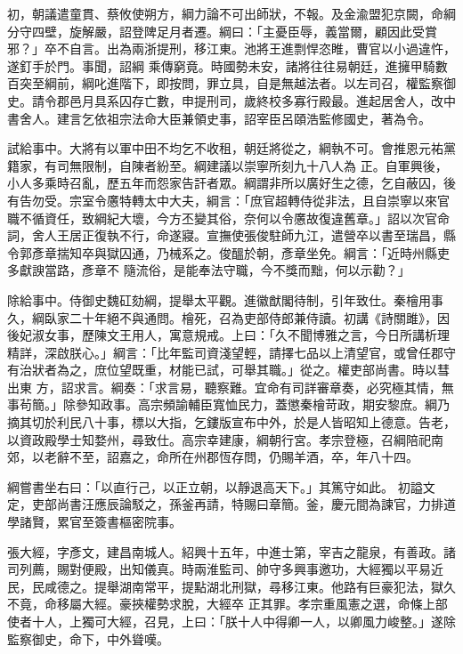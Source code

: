 \begin{pinyinscope}
 初，朝議遣童貫、蔡攸使朔方，綱力論不可出師狀，不報。及金渝盟犯京闕，命綱分守四壁，旋解嚴，詔登陴足月者遷。綱曰：「主憂臣辱，義當爾，顧因此受賞邪？」卒不自言。出為兩浙提刑，移江東。池將王進剽悍恣睢，曹官以小過違忤，遂釘手於門。事聞，詔綱
 乘傳窮竟。時國勢未安，諸將往往易朝廷，進擁甲騎數百突至綱前，綱叱進階下，即按問，罪立具，自是無越法者。以左司召，權監察御史。請令郡邑月具系囚存亡數，申提刑司，歲終校多寡行殿最。進起居舍人，改中書舍人。建言乞依祖宗法命大臣兼領史事，詔宰臣呂頤浩監修國史，著為令。



 試給事中。大將有以軍中田不均乞不收租，朝廷將從之，綱執不可。會推恩元祐黨籍家，有司無限制，自陳者紛至。綱建議以崇寧所刻九十八人為
 正。自軍興後，小人多乘時召亂，歷五年而怨家告訐者眾。綱謂非所以廣好生之德，乞自蔽囚，後有告勿受。宗室令懬特轉太中大夫，綱言：「庶官超轉侍從非法，且自崇寧以來官職不循資任，致綱紀大壞，今方丕變其俗，奈何以令懬故復違舊章。」詔以次官命詞，舍人王居正復執不行，命遂寢。宣撫使張俊駐師九江，遣營卒以書至瑞昌，縣令郭彥章揣知卒與獄囚通，乃械系之。俊醞於朝，彥章坐免。綱言：「近時州縣吏多獻諛當路，彥章不
 隨流俗，是能奉法守職，今不獎而黜，何以示勸？」



 除給事中。侍御史魏矼劾綱，提舉太平觀。進徽猷閣待制，引年致仕。秦檜用事久，綱臥家二十年絕不與通問。檜死，召為吏部侍郎兼侍讀。初講《詩關雎》，因後妃淑女事，歷陳文王用人，寓意規戒。上曰：「久不聞博雅之言，今日所講析理精詳，深啟朕心。」綱言：「比年監司資淺望輕，請擇七品以上清望官，或曾任郡守有治狀者為之，庶位望既重，材能已試，可舉其職。」從之。權吏部尚書。時以彗出東
 方，詔求言。綱奏：「求言易，聽察難。宜命有司詳審章奏，必究極其情，無事茍簡。」除參知政事。高宗頻諭輔臣寬恤民力，蓋懲秦檜苛政，期安黎庶。綱乃摘其切於利民八十事，標以大指，乞鏤版宣布中外，於是人皆昭知上德意。告老，以資政殿學士知婺州，尋致仕。高宗幸建康，綱朝行宮。孝宗登極，召綱陪祀南郊，以老辭不至，詔嘉之，命所在州郡恆存問，仍賜羊酒，卒，年八十四。



 綱嘗書坐右曰：「以直行己，以正立朝，以靜退高天下。」其篤守如此。
 初謚文定，吏部尚書汪應辰論駁之，孫釜再請，特賜曰章簡。釜，慶元間為諫官，力排道學諸賢，累官至簽書樞密院事。



 張大經，字彥文，建昌南城人。紹興十五年，中進士第，宰吉之龍泉，有善政。諸司列薦，賜對便殿，出知儀真。時兩淮監司、帥守多興事邀功，大經獨以平易近民，民咸德之。提舉湖南常平，提點湖北刑獄，尋移江東。他路有巨豪犯法，獄久不竟，命移屬大經。豪挾權勢求脫，大經卒
 正其罪。孝宗重風憲之選，命條上部使者十人，上獨可大經，召見，上曰：「朕十人中得卿一人，以卿風力峻整。」遂除監察御史，命下，中外聳嘆。




\end{pinyinscope}
